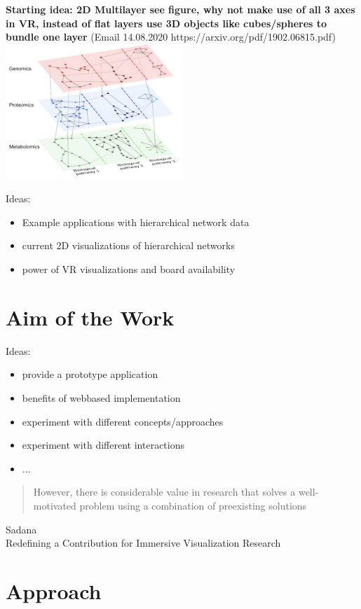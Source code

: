 \textbf{Starting idea: 2D Multilayer see figure, why not make use of all 3 axes in VR, instead of flat layers use 3D objects like cubes/spheres to bundle one layer} (Email 14.08.2020 https://arxiv.org/pdf/1902.06815.pdf)
\includegraphics[width=0.5\textwidth]{chapters/graphics/2dmultilayerVis.jpg}

Ideas:
\begin{itemize}
    \item Example applications with hierarchical network data
    \item current 2D visualizations of hierarchical networks
    \item power of VR visualizations and board availability
\end{itemize}

\section{Aim of the Work}

Ideas:
\begin{itemize}
    \item provide a prototype application
    \item benefits of webbased implementation 
    \item experiment with different concepts/approaches
    \item experiment with different interactions
    \item ...
\end{itemize}

\begin{quotation}
    However, there is considerable value in research that
    solves a well-motivated problem using a combination
    of preexisting solutions 
\end{quotation}
Sadana\\
Redefining a Contribution for Immersive Visualization Research\\

\section{Approach}

